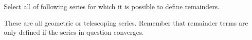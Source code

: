 \documentclass{ximera}
\author{Jim Talamo}
\begin{document}
\begin{exercise}

Select all of following series for which it is possible to define remainders.

\begin{selectAll}
\end{selectAll}

\begin{hint}
These are all geometric or telescoping series.  Remember that remainder terms are only defined if the series in question converges.
\end{hint}
\end{exercise}
\end{document}
